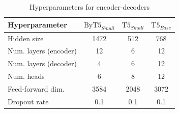 \begin{appendices}
\begin{table}[H]
\centering\small
\begin{tabular}{lccc}
\toprule
Hyperparameter                                   & $\text{ByT5}_{Small}$  & $\text{T5}_{Small}$ & $\text{T5}_{Base}$ \\ \midrule
Hidden size          & 1472 & 512 & 768         \\
Num. layers (encoder)  & 12 & 6 & 12       \\
Num. layers (decoder)  & 4 & 6 & 12     \\
Num. heads  & 6 & 8 & 12      \\
Feed-forward dim. & 3584 & 2048 & 3072        \\
Dropout rate & 0.1 & 0.1 & 0.1      \\ \bottomrule
\end{tabular}
\caption{Hyperparameters for encoder-decoders}
\label{tab:hp_t5}
\end{table}

\onecolumn

\end{appendices}
